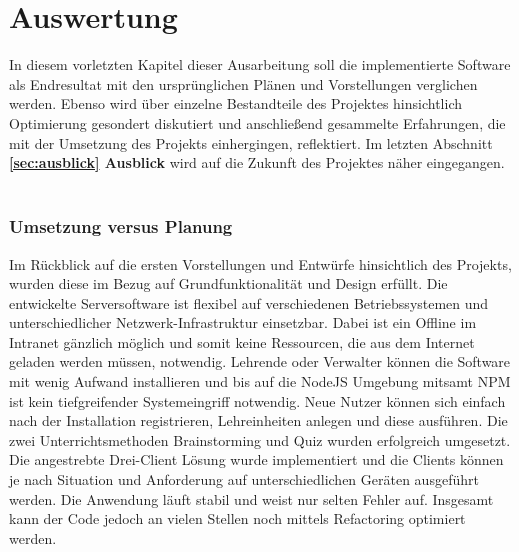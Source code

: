 \section{Auswertung}\label{sec:auswertung}
In diesem vorletzten Kapitel dieser Ausarbeitung soll die implementierte Software als Endresultat mit den ursprünglichen Plänen und Vorstellungen verglichen werden. Ebenso wird über einzelne Bestandteile des Projektes hinsichtlich Optimierung gesondert diskutiert und anschließend gesammelte Erfahrungen, die mit der Umsetzung des Projekts einhergingen, reflektiert. 
Im letzten Abschnitt \textbf{\ref{sec:ausblick} Ausblick} wird auf die Zukunft des Projektes näher eingegangen.
\\ \\
\subsubsection{Umsetzung versus Planung}\label{sec:umvsplan}
Im Rückblick auf die ersten Vorstellungen und Entwürfe hinsichtlich des Projekts, wurden diese im Bezug auf Grundfunktionalität und Design erfüllt. Die entwickelte Serversoftware ist flexibel auf verschiedenen Betriebssystemen und unterschiedlicher Netzwerk-Infrastruktur einsetzbar. Dabei ist ein Offline im Intranet gänzlich möglich und somit keine Ressourcen, die aus dem Internet geladen werden müssen, notwendig. Lehrende oder Verwalter können die Software mit wenig Aufwand installieren und bis auf die NodeJS Umgebung mitsamt NPM ist kein tiefgreifender Systemeingriff notwendig. Neue Nutzer können sich einfach nach der Installation registrieren, Lehreinheiten anlegen und diese ausführen. Die zwei Unterrichtsmethoden Brainstorming und Quiz wurden erfolgreich umgesetzt. Die angestrebte Drei-Client Lösung wurde implementiert und die Clients können je nach Situation und Anforderung auf unterschiedlichen Geräten ausgeführt werden. Die Anwendung läuft stabil und weist nur selten Fehler auf. Insgesamt kann der Code jedoch an vielen Stellen noch mittels Refactoring optimiert werden. 

